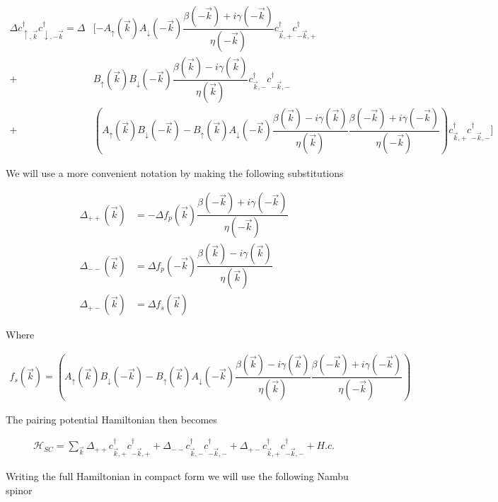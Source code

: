\begin{equation}
  \begin{split}
    \Delta c_{\uparrow,\vec{k}}^{\dagger}c_{\downarrow,-\vec{k}}^{\dagger}  = \Delta &[ -A_{\uparrow}(\vec{k})A_{\downarrow}(-\vec{k})\dfrac{\beta(-\vec{k})+i\gamma(-\vec{k})}{\eta(-\vec{k})}c_{\vec{k},+}^{\dagger}c_{-\vec{k},+}^{\dagger} \\
    + & B_{\uparrow}(\vec{k})B_{\downarrow}(-\vec{k})\dfrac{\beta(\vec{k})-i\gamma(\vec{k})}{\eta(\vec{k})}c_{\vec{k},-}^{\dagger}c_{-\vec{k},-}^{\dagger}  \\
  +&\left(A_{\uparrow}(\vec{k})B_{\downarrow}(-\vec{k})-B_{\uparrow}(\vec{k})A_{\downarrow}(-\vec{k})\dfrac{\beta(\vec{k})-i\gamma(\vec{k})}{\eta(\vec{k})}\dfrac{\beta(-\vec{k})+i\gamma(-\vec{k})}{\eta(-\vec{k})} \right) c_{\vec{k},+}^{\dagger}c_{-\vec{k},-}^{\dagger} ]
  \end{split}
\end{equation}

We will use a more convenient notation by making the following substitutions

\begin{align}
  \Delta_{++}(\vec{k}) &= -\Delta f_p(\vec{k}) \dfrac{\beta(-\vec{k}) +i\gamma(-\vec{k})}{\eta(-\vec{k})} \\
  \Delta_{--}(\vec{k}) &= \Delta f_p(-\vec{k}) \dfrac{\beta(\vec{k}) -i\gamma(\vec{k})}{\eta(\vec{k})} \\
  \Delta_{+-}(\vec{k}) &= \Delta f_s(\vec{k})
\end{align}

Where

\begin{align}
  f_s(\vec{k}) = \left(A_{\uparrow}(\vec{k})B_{\downarrow}(-\vec{k})-B_{\uparrow}(\vec{k})A_{\downarrow}(-\vec{k})\dfrac{\beta(\vec{k})-i\gamma(\vec{k})}{\eta(\vec{k})}\dfrac{\beta(-\vec{k})+i\gamma(-\vec{k})}{\eta(-\vec{k})} \right)
\end{align}

The pairing potential Hamiltonian then becomes

\begin{align}
  \mathcal{H}_{SC} = \sum\limits_{\vec{k}} \Delta_{++}c_{\vec{k},+}^{\dagger}c_{-\vec{k},+}^{\dagger} + \Delta_{--}c_{\vec{k},-}^{\dagger}c_{-\vec{k},-}^{\dagger} +\Delta_{+-}c_{\vec{k},+}^{\dagger}c_{-\vec{k},-}^{\dagger} + H.c.
\end{align}

Writing the full Hamiltonian in compact form we will use the following Nambu spinor

